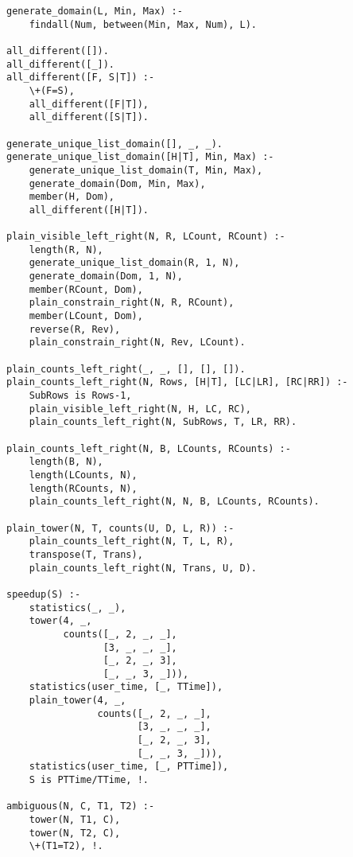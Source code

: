 \documentclass[8pt,twocolumn]{article}
\begin{document}
\begin{verbatim}
generate_domain(L, Min, Max) :-
    findall(Num, between(Min, Max, Num), L).

all_different([]).
all_different([_]).
all_different([F, S|T]) :-
    \+(F=S),
    all_different([F|T]),
    all_different([S|T]).

generate_unique_list_domain([], _, _).
generate_unique_list_domain([H|T], Min, Max) :-
    generate_unique_list_domain(T, Min, Max),
    generate_domain(Dom, Min, Max),
    member(H, Dom),
    all_different([H|T]).

plain_visible_left_right(N, R, LCount, RCount) :-
    length(R, N),
    generate_unique_list_domain(R, 1, N),
    generate_domain(Dom, 1, N),
    member(RCount, Dom),
    plain_constrain_right(N, R, RCount),
    member(LCount, Dom),
    reverse(R, Rev),
    plain_constrain_right(N, Rev, LCount).

plain_counts_left_right(_, _, [], [], []).
plain_counts_left_right(N, Rows, [H|T], [LC|LR], [RC|RR]) :-
    SubRows is Rows-1,
    plain_visible_left_right(N, H, LC, RC),
    plain_counts_left_right(N, SubRows, T, LR, RR).

plain_counts_left_right(N, B, LCounts, RCounts) :-
    length(B, N),
    length(LCounts, N),
    length(RCounts, N),
    plain_counts_left_right(N, N, B, LCounts, RCounts).

plain_tower(N, T, counts(U, D, L, R)) :-
    plain_counts_left_right(N, T, L, R),
    transpose(T, Trans),
    plain_counts_left_right(N, Trans, U, D).

speedup(S) :-
    statistics(_, _),
    tower(4, _,
          counts([_, 2, _, _],
                 [3, _, _, _],
                 [_, 2, _, 3],
                 [_, _, 3, _])),
    statistics(user_time, [_, TTime]),
    plain_tower(4, _,
                counts([_, 2, _, _],
                       [3, _, _, _],
                       [_, 2, _, 3],
                       [_, _, 3, _])),
    statistics(user_time, [_, PTTime]),
    S is PTTime/TTime, !.

ambiguous(N, C, T1, T2) :-
    tower(N, T1, C),
    tower(N, T2, C),
    \+(T1=T2), !.
\end{verbatim}
\end{document}
